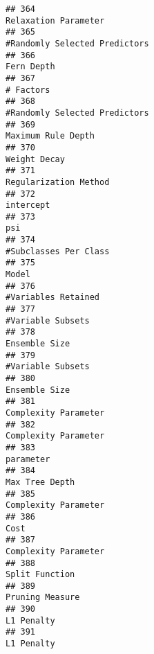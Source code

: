 \documentclass[
]{article}
\begin{document}
\begin{verbatim}
## 364                                                                    Relaxation Parameter
## 365                                                           #Randomly Selected Predictors
## 366                                                                              Fern Depth
## 367                                                                               # Factors
## 368                                                           #Randomly Selected Predictors
## 369                                                                      Maximum Rule Depth
## 370                                                                            Weight Decay
## 371                                                                   Regularization Method
## 372                                                                               intercept
## 373                                                                                     psi
## 374                                                                   #Subclasses Per Class
## 375                                                                                   Model
## 376                                                                     #Variables Retained
## 377                                                                       #Variable Subsets
## 378                                                                           Ensemble Size
## 379                                                                       #Variable Subsets
## 380                                                                           Ensemble Size
## 381                                                                    Complexity Parameter
## 382                                                                    Complexity Parameter
## 383                                                                               parameter
## 384                                                                          Max Tree Depth
## 385                                                                    Complexity Parameter
## 386                                                                                    Cost
## 387                                                                    Complexity Parameter
## 388                                                                          Split Function
## 389                                                                         Pruning Measure
## 390                                                                              L1 Penalty
## 391                                                                              L1 Penalty

\end{verbatim}
\end{document}
